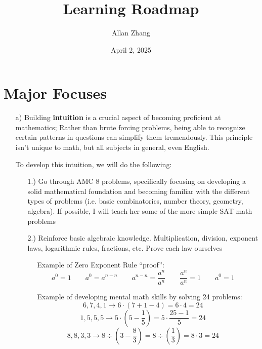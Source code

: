 \documentclass[hidelinks]{article}
\title{\textbf{Learning Roadmap}}
\author{Allan Zhang}
\date{April 2, 2025}
\begin{document}
\hypersetup{bookmarksnumbered=true,}
\pagecolor{white}
\color{black}
\maketitle 
\section*{Major Focuses}
\begin{itemize}
    \item[a)] Building \textbf{intuition} is a crucial aspect of becoming proficient at mathematics; Rather than brute forcing problems, being able to recognize certain patterns in questions can simplify them tremendously. This principle isn't unique to math, but all subjects in general, even English.  
    \item[] To develop this intuition, we will do the following: 
    \begin{itemize}
        \item[1.)] Go through AMC 8 problems, specifically focusing on developing a solid mathematical foundation and becoming familiar with the different types of problems (i.e. basic combinatorics, number theory, geometry, algebra). If possible, I will teach her some of the more simple SAT math problems
        \item[2.)] Reinforce basic algebraic knowledge. Multiplication, division, exponent laws, logarithmic rules, fractions, etc. Prove each law ourselves
        \item[] $\quad$ Example of Zero Exponent Rule ``proof'': 
            \[
                a^0 = 1 \quad \quad a^0 = a^{n - n} \quad \quad a^{n - n} = \frac{a^n}{a^n} \quad \quad \frac{a^n}{a^n} = 1  
               \quad \quad \boxed{a^0 = 1}
            \]
        \item[] $\quad$ Example of developing mental math skills by solving 24 problems: 
            \[
            6, 7, 4, 1 \rightarrow 6 \cdot (7 + 1 - 4) = 6 \cdot 4 = 24
            \]
            \[
                1, 5, 5, 5 \rightarrow 5 \cdot ( 5 - \frac{1}{5}) =  
                5 \cdot \frac{25 - 1}{5} = 24 
            \]
            \[
                8, 8, 3, 3 \rightarrow 8 \div (3 - \frac{8}{3}) = 8 \div (\frac{1}{3}) = 8 \cdot 3 = 24  
            \]
    \end{itemize}
    

\end{itemize}
\end{document}
